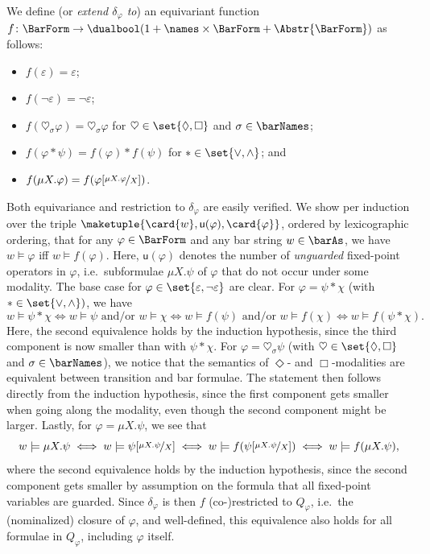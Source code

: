 \documentclass[10pt, final, conference, a4paper, twocolumn]{IEEEtran}
\begin{document}
\begin{IEEEproof}
  We define (or \emph{extend $\delta_\varphi$ to}) an equivariant function $f\colon \BarForm \to \dualbool(1 +
  \names \times \BarForm + \Abstr{\BarForm})$ as follows:
  \begin{itemize}
    \item $f(\varepsilon) = \varepsilon$;
    \item $f(\neg\varepsilon) = \neg\varepsilon$;
    \item $f(\heartsuit_\sigma \varphi) = \heartsuit_\sigma \varphi$ for $\heartsuit \in \set{\Diamond, \Box}$ and
      $\sigma \in \barNames$;
    \item $f(\varphi \ast \psi) = f(\varphi) \ast f(\psi)$ for $\ast \in \set{\vee, \wedge}$; and
    \item $f(\mu X. \varphi) = f(\varphi[\nicefrac{\mu X.\varphi}{X}])$.
  \end{itemize}
  Both equivariance and restriction to $\delta_\varphi$ are easily verified. We show per induction over the triple
  $\maketuple{\card{w}, \textsf{u}(\varphi), \card{\varphi}}$, ordered by lexicographic ordering, that for any
  $\varphi \in \BarForm$ and any bar string $w \in \barAs$, we have $w \models \varphi$ iff $w \models f(\varphi)$.
  Here, $\textsf{u}(\varphi)$ denotes the number of \emph{unguarded} fixed-point operators in $\varphi$,
  i.e.~subformulae $\mu X. \psi$ of $\varphi$ that do not occur under some modality.
  The base case for $\varphi \in \set{\varepsilon, \neg\varepsilon}$ are clear.
  For $\varphi = \psi \ast \chi$ (with $\ast \in \set{\vee, \wedge})$, we have
  \[ w \models \psi \ast \chi \iff w \models \psi \text{ and/or } w \models \chi \iff w \models f(\psi)
  \text{ and/or } w \models f(\chi) \iff w \models f(\psi \ast \chi). \]
  Here, the second equivalence holds by the induction hypothesis, since the third component is now smaller than
  with $\psi \ast \chi$.
  For $\varphi = \heartsuit_\sigma \psi$ (with $\heartsuit \in \set{\Diamond, \Box}$ and
  $\sigma \in \barNames$), we notice that the semantics of $\Diamond$- and $\Box$-modalities are equivalent
  between transition and bar formulae. The statement then follows directly from the induction
  hypothesis, since the first component gets smaller when going along the modality, even though the second
  component might be larger.
  Lastly, for $\varphi = \mu X. \psi$, we see that
  \[ w \models \mu X. \psi \iff w \models \psi[\nicefrac{\mu X.\psi}{X}] \iff 
    w \models f(\psi[\nicefrac{\mu X.\psi}{X}]) \iff w \models f(\mu X. \psi), \]
  where the second equivalence holds by the induction hypothesis, since the second component gets smaller
  by assumption on the formula that all fixed-point variables are guarded.
  Since $\delta_\varphi$ is then $f$ (co-)restricted to $Q_\varphi$, i.e.~the (nominalized) closure of $\varphi$, and
  well-defined, this equivalence also holds for all formulae in $Q_\varphi$, including $\varphi$ itself.
\end{IEEEproof}
\end{document}
